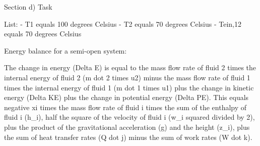 Section d) Task

List:
- T1 equals 100 degrees Celsius
- T2 equals 70 degrees Celsius
- Tein,12 equals 70 degrees Celsius

Energy balance for a semi-open system:

The change in energy (Delta E) is equal to the mass flow rate of fluid 2 times the internal energy of fluid 2 (m dot 2 times u2) minus the mass flow rate of fluid 1 times the internal energy of fluid 1 (m dot 1 times u1) plus the change in kinetic energy (Delta KE) plus the change in potential energy (Delta PE). This equals negative xi times the mass flow rate of fluid i times the sum of the enthalpy of fluid i (h_i), half the square of the velocity of fluid i (w_i squared divided by 2), plus the product of the gravitational acceleration (g) and the height (z_i), plus the sum of heat transfer rates (Q dot j) minus the sum of work rates (W dot k).